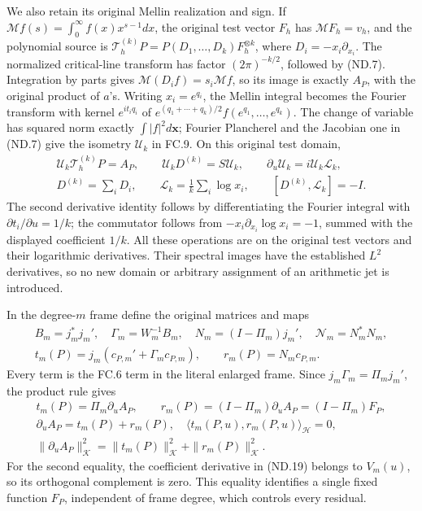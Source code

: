 We also retain its original Mellin realization and sign. If
\(\mathcal M f(s)=\int_0^\infty f(x)x^{s-1}dx\), the original
test vector \(F_h\) has \(\mathcal M F_h=v_h\), and the
polynomial source is
\(\mathcal T_h^{(k)}P=P(D_1,\ldots,D_k)F_h^{\otimes k}\),
where \(D_i=-x_i\partial_{x_i}\). The normalized critical-line
transform has factor \((2\pi)^{-k/2}\), followed by (ND.7).
Integration by parts gives \(\mathcal M(D_i f)=s_i\mathcal M f\),
so its image is exactly \(A_P\), with the original product of
\(a\)'s. Writing \(x_i=e^{q_i}\), the Mellin integral becomes
the Fourier transform with kernel \(e^{it_iq_i}\) of
\(e^{(q_1+\cdots+q_k)/2}f(e^{q_1},\ldots,e^{q_k})\).
The change of variable has squared norm exactly \(\int|f|^2d\mathbf x\);
Fourier Plancherel and the Jacobian one in (ND.7) give the isometry
\(\mathscr U_k\) in FC.9. On this original test domain,
\[
 \begin{gathered}
 \mathscr U_k\mathcal T_h^{(k)}P=A_P,\qquad
 \mathscr U_kD^{(k)}=S\mathscr U_k,\qquad
 \partial_u\mathscr U_k=i\mathscr U_k\mathscr L_k,\\
 D^{(k)}=\sum_iD_i,\qquad
 \mathscr L_k=\frac1k\sum_i\log x_i,\qquad
 [D^{(k)},\mathscr L_k]=-I.
 \end{gathered}
 \tag{ND.21}
\]
The second derivative identity follows by differentiating the Fourier
integral with \(\partial t_i/\partial u=1/k\); the commutator
follows from \(-x_i\partial_{x_i}\log x_i=-1\), summed with
the displayed coefficient \(1/k\). All these operations are on
the original test vectors and their logarithmic derivatives. Their
spectral images have the established \(L^2\) derivatives, so no
new domain or arbitrary assignment of an arithmetic jet is introduced.

In the degree-\(m\) frame define the original matrices and maps
\[
 \begin{gathered}
 B_m=j_m^*j_m',\quad \Gamma_m=W_m^{-1}B_m,\quad
 N_m=(I-\Pi_m)j_m',\quad \mathcal N_m=N_m^*N_m,\\
 t_m(P)=j_m(c_{P,m}'+\Gamma_m c_{P,m}),\qquad
 r_m(P)=N_m c_{P,m}.
 \end{gathered}
 \tag{ND.22}
\]
Every term is the FC.6 term in the literal enlarged frame. Since
\(j_m\Gamma_m=\Pi_mj_m'\), the product rule gives
\[
 \begin{gathered}
 t_m(P)=\Pi_m\partial_uA_P,\qquad
 r_m(P)=(I-\Pi_m)\partial_uA_P=(I-\Pi_m)F_P,\\
 \partial_uA_P=t_m(P)+r_m(P),\quad
 \langle t_m(P,u),r_m(P,u)\rangle_{\mathscr H}=0,\\
 \|\partial_uA_P\|_{\mathscr K}^2
     =\|t_m(P)\|_{\mathscr K}^2+\|r_m(P)\|_{\mathscr K}^2.
 \end{gathered}
 \tag{ND.23}
\]
For the second equality, the coefficient derivative in (ND.19) belongs
to \(V_m(u)\), so its orthogonal complement is zero. This equality
identifies a single fixed function \(F_P\), independent of frame
degree, which controls every residual.

